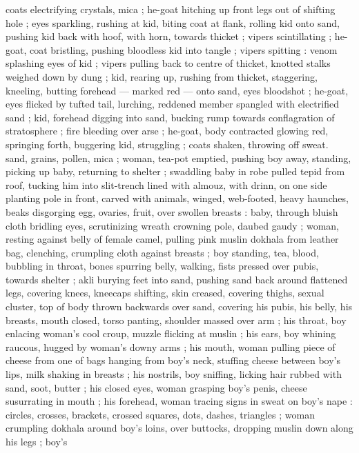 coats electrifying crystals, mica ; he-goat hitching up front legs out 
of shifting hole ; eyes sparkling, rushing at kid, biting coat at flank, 
rolling kid onto sand, pushing kid back with hoof, with horn, towards 
thicket ; vipers scintillating ; he-goat, coat bristling, pushing 
bloodless kid into tangle ; vipers spitting : venom splashing eyes of 
kid ; vipers pulling back to centre of thicket, knotted stalks weighed 
down by dung ; kid, rearing up, rushing from thicket, staggering, 
kneeling, butting forehead --- marked red --- onto sand, eyes 
bloodshot ; he-goat, eyes flicked by tufted tail, lurching, reddened 
member spangled with electrified sand ; kid, forehead digging into 
sand, bucking rump towards conflagration of stratosphere ; fire 
bleeding over arse ; he-goat, body contracted glowing red, springing 
forth, buggering kid, struggling ; coats shaken, throwing off sweat. 
sand, grains, pollen, mica ; woman, tea-pot emptied, pushing boy 
away, standing, picking up baby, returning to shelter ; swaddling 
baby in robe pulled tepid from roof, tucking him into slit-trench lined 
with almouz, with drinn, on one side planting pole in front, carved 
with animals, winged, web-footed, heavy haunches, beaks disgorging 
egg, ovaries, fruit, over swollen breasts : baby, through bluish cloth 
bridling eyes, scrutinizing wreath crowning pole, daubed gaudy ; 
woman, resting against belly of female camel, pulling pink muslin 
dokhala from leather bag, clenching, crumpling cloth against breasts 
; boy standing, tea, blood, bubbling in throat, bones spurring belly, 
walking, fists pressed over pubis, towards shelter ; akli burying feet 
into sand, pushing sand back around flattened legs, covering knees, 
kneecaps shifting, skin creased, covering thighs, sexual cluster, top 
of body thrown backwards over sand, covering his pubis, his belly, 
his breasts, mouth closed, torso panting, shoulder massed over arm 
; his throat, boy enlacing woman's cool croup, muzzle flicking at 
muslin ; his ears, boy whining raucous, hugged by woman's downy 
arms ; his mouth, woman pulling piece of cheese from one of bags 
hanging from boy's neck, stuffing cheese between boy's lips, milk 
shaking in breasts ; his nostrils, boy sniffing, licking hair rubbed with 
sand, soot, butter ; his closed eyes, woman grasping boy's penis, 
cheese susurrating in mouth ; his forehead, woman tracing signs in 
sweat on boy's nape : circles, crosses, brackets, crossed squares, 
dots, dashes, triangles ; woman crumpling dokhala around boy's 
loins, over buttocks, dropping muslin down along his legs ; boy's 
